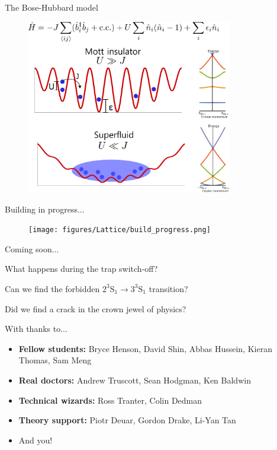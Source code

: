 \documentclass{beamer}
\begin{document}
\begin{frame}{The Bose-Hubbard model}
    \begin{figure}
        \centering
        \includegraphics[width=0.8\textwidth]{figures/Lattice/potential_bands.png}
        \label{fig:my_label}
    \end{figure}
\end{frame}

\begin{frame}{Building in progress...}
    \begin{figure}
        \centering
        \texttt{[image: figures/Lattice/build\_progress.png]}
        \label{fig:my_label}
    \end{figure}
\end{frame}


\begin{frame}{Coming soon...}

What happens during the trap switch-off?\vspace{1in}

Can we find the forbidden $2^3\textrm{S}_1\rightarrow 3^3\textrm{S}_1$ transition?\vspace{1in}
        
Did we find a crack in the crown jewel of physics?
        

\end{frame}


\begin{frame}{With thanks to...}
    \begin{itemize}
        \item \textbf{Fellow students:} Bryce Henson, David Shin, Abbas Hussein, Kieran Thomas, Sam Meng
        \item \textbf{Real doctors:} Andrew Truscott, Sean Hodgman, Ken Baldwin
        \item \textbf{Technical wizards:} Ross Tranter, Colin Dedman
        \item \textbf{Theory support:} Piotr Deuar, Gordon Drake, Li-Yan Tan
        \item And you!
    \end{itemize}
\end{frame}

 
 
 
\end{document}
